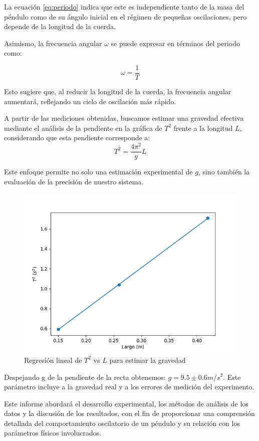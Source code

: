 \documentclass[12pt,a4]{article}
\begin{document}
La ecuación \ref{eq:periodo} indica que este es independiente tanto de la masa del péndulo como de su ángulo inicial en el régimen de pequeñas oscilaciones, pero depende de la longitud de la cuerda.

Asimismo, la frecuencia angular \(\omega\) se puede expresar en términos del periodo como:

\begin{equation}
    \omega = \frac{1}{T}
    \label{eq:omega}
\end{equation}

Esto sugiere que, al reducir la longitud de la cuerda, la frecuencia angular aumentará, reflejando un ciclo de oscilación más rápido.

A partir de las mediciones obtenidas, buscamos estimar una gravedad efectiva mediante el análisis de la pendiente en la gráfica de \( T^2 \) frente a la longitud \( L \), considerando que esta pendiente corresponde a:
\begin{equation}
    T^2 = \frac{4 \pi^2}{g} L
    \label{eq:gravedad}
\end{equation}

Este enfoque permite no solo una estimación experimental de \( g \), sino también la evaluación de la precisión de nuestro sistema.

\begin{figure}[H]
    \centering
    \includegraphics[width=0.6\linewidth]{gravedad.png}
    \caption{Regresión lineal de \( T^2 \) vs \( L \) para estimar la gravedad}   
    \label{fig:gravedad}
\end{figure}

Despejando g de la pendiente de la recta obtenemos: $g = 9.5 \pm 0.6 m/s^2$. Este parámetro incluye a la gravedad real y a los errores de medición del experimento.

Este informe abordará el desarrollo experimental, los métodos de análisis de los datos y la discusión de los resultados, con el fin de proporcionar una comprensión detallada del comportamiento oscilatorio de un péndulo y su relación con los parámetros físicos involucrados.
\end{document}
